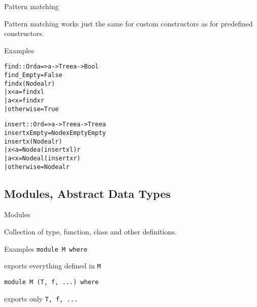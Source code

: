 \documentclass{beamer}
\def\code#1{\texttt{\frenchspacing#1}}
\begin{document}
\begin{frame}[fragile]{Pattern matching}

Pattern matching works just the same for custom constructors as for predefined constructors.

\pause

\begin{exampleblock}{Examples}
\begin{alltt}
find :: Ord a => a -> Tree a -> Bool\pause
find _ Empty = False\pause
find x (Node a l r)\pause
  | x < a     = find x l\pause
  | a < x     = find x r\pause
  | otherwise = True

insert :: Ord => a -> Tree a -> Tree a\pause
insert x Empty = Node x Empty Empty\pause
insert x (Node a l r)\pause
  | x < a     = Node a (insert x l) r\pause
  | a < x     = Node a l (insert x r)\pause
  | otherwise = Node a l r
\end{alltt}
\end{exampleblock}

\end{frame}

\subsection{Modules, Abstract Data Types}

\begin{frame}{Modules}

Collection of type, function, class and other definitions.

\pause

\begin{exampleblock}{Examples}
\code{module M where} \par
exports everything defined in \code{M}\pause

\vspace{0.25cm}
\code{module M (T, f, ...) where} \par
exports only \code{T, f, ...}
\end{exampleblock}

\end{frame}
\end{document}
